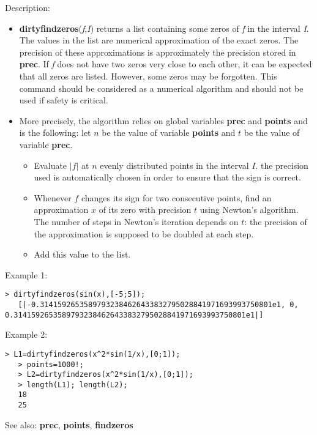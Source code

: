 \noindent Description: \begin{itemize}

\item \textbf{dirtyfindzeros}(\emph{f},\emph{I}) returns a list containing some zeros of \emph{f} in the
   interval \emph{I}. The values in the list are numerical approximation of the exact
   zeros. The precision of these approximations is approximately the precision
   stored in \textbf{prec}. If \emph{f} does not have two zeros very close to each other, it 
   can be expected that all zeros are listed. However, some zeros may be
   forgotten. This command should be considered as a numerical algorithm and
   should not be used if safety is critical.

\item More precisely, the algorithm relies on global variables \textbf{prec} and \textbf{points} and
   is the following: let $n$ be the value of variable \textbf{points} and $t$ be the value
   of variable \textbf{prec}.
   \begin{itemize}
   \item  Evaluate $|f|$ at $n$ evenly distributed points in the interval $I$.
     the precision used is automatically chosen in order to ensure that the sign
     is correct.
   \item  Whenever $f$ changes its sign for two consecutive points,
     find an approximation $x$ of its zero with precision $t$ using
     Newton's algorithm. The number of steps in Newton's iteration depends on $t$:
     the precision of the approximation is supposed to be doubled at each step.
   \item  Add this value to the list.
   \end{itemize}
\end{itemize}
\noindent Example 1: 
\begin{center}\begin{minipage}{14.8cm}\begin{Verbatim}[frame=single]
   > dirtyfindzeros(sin(x),[-5;5]);
   [|-0.31415926535897932384626433832795028841971693993750801e1, 0, 0.31415926535897932384626433832795028841971693993750801e1|]
\end{Verbatim}
\end{minipage}\end{center}
\noindent Example 2: 
\begin{center}\begin{minipage}{14.8cm}\begin{Verbatim}[frame=single]
   > L1=dirtyfindzeros(x^2*sin(1/x),[0;1]);
   > points=1000!;
   > L2=dirtyfindzeros(x^2*sin(1/x),[0;1]);
   > length(L1); length(L2);
   18
   25
\end{Verbatim}
\end{minipage}\end{center}
See also: \textbf{prec}, \textbf{points}, \textbf{findzeros}
